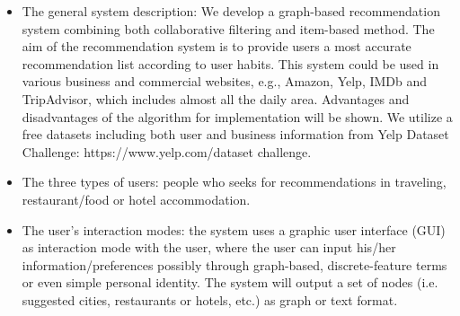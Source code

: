 
\begin{itemize} 


\item{
	The general system description: We develop a graph-based recommendation system combining both collaborative filtering and item-based method. The aim of the recommendation system is to provide users a most accurate recommendation list according to user habits. This system could be used in various business and commercial websites, e.g., Amazon, Yelp, IMDb and TripAdvisor, which includes almost all the daily area. Advantages and disadvantages of the algorithm for implementation will be shown. We utilize a free datasets including both user and business information from Yelp Dataset Challenge: https://www.yelp.com/dataset challenge.

} 


\item{	
	
The three types of users: 
people who seeks for recommendations in traveling, restaurant/food or hotel accommodation.
	
} 


\item{	

The user's interaction modes: the system uses a graphic user interface (GUI) as interaction mode with the user, where the user can input his/her information/preferences possibly through graph-based, discrete-feature terms or even simple personal identity. The system will output a set of nodes (i.e. suggested cities, restaurants or hotels, etc.) as graph or text format. 
	
}


\end{itemize}
